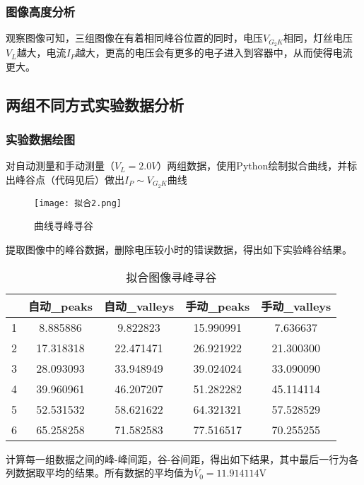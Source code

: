 \documentclass[dvipsnames, svgnames,a4paper,11pt]{article}
\begin{document}
			\subsubsection{图像高度分析}
				观察图像可知，三组图像在有着相同峰谷位置的同时，电压$V_{G_2K}$相同，灯丝电压$V_{L}$越大，电流$I_P$越大，更高的电压会有更多的电子进入到容器中，从而使得电流更大。

					

	\subsection{两组不同方式实验数据分析}
	\subsubsection{实验数据绘图}
	对自动测量和手动测量（$V_L=2.0V$）两组数据，使用Python绘制拟合曲线，并标出峰谷点（代码见后）做出$I_P{\sim}V_{G_2K}$曲线
	\begin{figure}[{H}]
		\centering
		\texttt{[image: 拟合2.png]}
		\caption{曲线寻峰寻谷}
		\label{}
	\end{figure}
提取图像中的峰谷数据，删除电压较小时的错误数据，得出如下实验峰谷结果。
	\begin{table}[H]
		\centering
		\begin{tabular}{ccccc}
		\hline
		& 自动\_peaks & 自动\_valleys & 手动\_peaks & 手动\_valleys\\
		\hline
		1 & 8.885886 & 9.822823 & 15.990991 & 7.636637 \\
		2 & 17.318318 & 22.471471 & 26.921922 & 21.300300 \\
		3 & 28.093093 & 33.948949 & 39.024024 & 33.090090 \\
		4 & 39.960961 & 46.207207 & 51.282282 & 45.114114 \\
		5 & 52.531532 & 58.621622 & 64.321321 & 57.528529 \\
		6 & 65.258258 & 71.582583 & 77.516517 & 70.255255 \\
		\hline
		\end{tabular}
		\caption{拟合图像寻峰寻谷}
		\label{tab:my_table}
		\end{table}
		计算每一组数据之间的峰-峰间距，谷-谷间距，得出如下结果，其中最后一行为各列数据取平均的结果。所有数据的平均值为$\bar{V}_{0}=11.914114\mathrm{V}$
\end{document}
